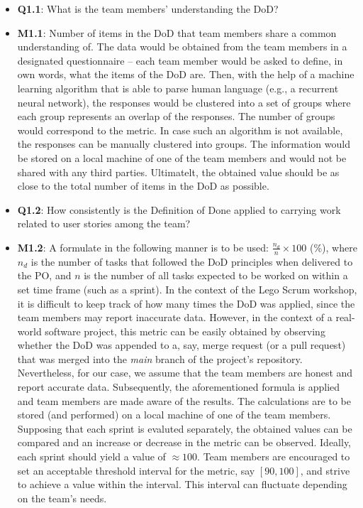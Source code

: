 \documentclass[conference]{IEEEtran}
\begin{document}
\begin{itemize}
  \item \textbf{Q1.1}: What is the team members' understanding the DoD?
  \item \textbf{M1.1}: Number of items in the DoD that team members share a
    common understanding of. The data would be obtained from the team members
    in a designated questionnaire -- each team member would be asked to define,
    in own words, what the items of the DoD are. Then, with the help of a
    machine learning algorithm that is able to parse human language (e.g., a
    recurrent neural network), the responses would be clustered into a set of
    groups where each group represents an overlap of the responses. The number
    of groups would correspond to the metric. In case such an algorithm is not
    available, the responses can be manually clustered into groups. The
    information would be stored on a local machine of one of the team members
    and would not be shared with any third parties. Ultimatelt, the obtained
    value should be as close to the total number of items in the DoD as
    possible.
  \item \textbf{Q1.2}: How consistently is the Definition of Done applied to
    carrying work related to user stories among the team?
  \item \textbf{M1.2}: A formulate in the following manner is to be used:
    $\frac{n_d}{n} \times 100$ (\%), where $n_d$ is the number of tasks that
    followed the DoD principles when delivered to the PO, and $n$ is the number
    of all tasks expected to be worked on within a set time frame (such as a
    sprint). In the context of the Lego Scrum workshop, it is difficult to keep
    track of how many times the DoD was applied, since the team members may
    report inaccurate data. However, in the context of a real-world software
    project, this metric can be easily obtained by observing whether the DoD
    was appended to a, say, merge request (or a pull request) that was merged into
    the \textit{main} branch of the project's repository. Nevertheless, for our case, we
    assume that the team members are honest and report accurate data.
    Subsequently, the aforementioned formula is applied and team members are
    made aware of the results. The calculations are to be stored (and
    performed) on a local machine of one of the team members. Supposing that
    each sprint is evaluted separately, the obtained values can be compared and
    an increase or decrease in the metric can be observed. Ideally, each sprint
    should yield a value of $\approx 100$. Team members are encouraged to set
    an acceptable threshold interval for the metric, say $[90, 100]$, and
    strive to achieve a value within the interval. This interval can fluctuate
    depending on the team's needs.
\end{itemize}
\end{document}
